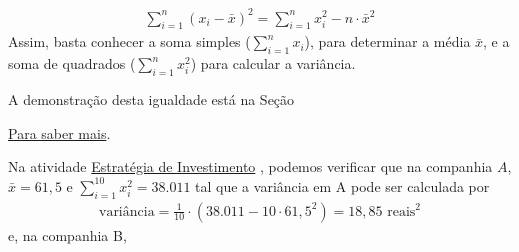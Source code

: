 {{\begin{equation*}
\begin{split}\sum^n_{i=1} (x_i-\bar{x})^2 = \sum^n_{i=1} x^2_i-n\cdot \bar{x}^2\end{split}
\end{equation*}
Assim, basta conhecer a soma simples (\(\displaystyle{\sum^n_{i=1}}x_i\)), para determinar a média \(\bar{x}\), e a soma de quadrados (\(\displaystyle{\sum^n_{i=1}}x^2_i\)) para calcular a variância.

A demonstração desta igualdade está na Seção {\hyperref[\detokenize{PE104-A:sec-para-saber-mais}]{Para saber mais}.

Na atividade \hyperref[\detokenize{PE104-3:ativ-estrategia-de-investimento}]{Estratégia de Investimento} , podemos verificar que na companhia $A$, \(\bar{x}=61,5\) e \(\displaystyle{\sum^{10}_{i=1}} x^2_i=38.011\) tal que a variância em A pode ser calculada por
\begin{equation*}
\begin{split}\text{variância}=\frac{1}{10}\cdot (38.011-10\cdot 61,5^2)=18,85\text{ reais}^2\end{split}
\end{equation*}
e, na companhia B,

}}}
